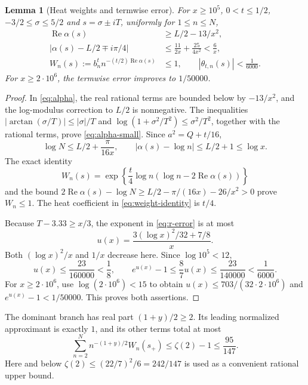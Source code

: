 \documentclass[11pt]{article}
\newtheorem{lemma}[theorem]{Lemma}
\theoremstyle{remark}
\newcommand{\abs}[1]{\left\lvert#1\right\rvert}
\numberwithin{equation}{section}
\begin{document}
\begin{lemma}[Heat weights and termwise error]\label{lem:ordinary}
For $x\ge10^5$, $0<t\le1/2$, $-3/2\le\sigma\le5/2$ and
$s=\sigma\pm iT$, uniformly for $1\le n\le N$,
\begin{align}
 \operatorname{Re}\alpha(s)&\ge L/2-13/x^2,\label{eq:alpha-real}\\
 \abs{\alpha(s)-L/2\mp i\pi/4}
    &\le\frac{11}{2x}+\frac{25}{4x^2}<\frac6x,\label{eq:alpha-small}\\
 W_n(s):=b_n^t n^{-(t/2)\operatorname{Re}\alpha(s)}&\le1,
 \qquad |\theta_{t,n}(s)|<\frac1{6000}.\label{eq:weights-error}
\end{align}
For $x\ge2\cdot10^6$, the termwise error improves to $1/50000$.
\end{lemma}
\begin{proof}
In \eqref{eq:alpha}, the real rational terms are bounded below by
$-13/x^2$, and the log-modulus correction to $L/2$ is nonnegative.
The inequalities $|\arctan(\sigma/T)|\le|\sigma|/T$ and
$\log(1+\sigma^2/T^2)\le\sigma^2/T^2$, together with the rational
terms, prove \eqref{eq:alpha-small}. Since $a^2=Q+t/16$,
\[
 \log N\le L/2+\frac{\pi}{16x},\qquad
 \abs{\alpha(s)-\log n}\le L/2+1\le\log x.
\]
The exact identity
\begin{equation}\label{eq:weight-identity}
 W_n(s)=\exp\left\{\frac t4\log n
                  (\log n-2\operatorname{Re}\alpha(s))\right\}
\end{equation}
and the bound
$2\operatorname{Re}\alpha(s)-\log N
 \ge L/2-\pi/(16x)-26/x^2>0$ prove $W_n\le1$.
The heat coefficient in \eqref{eq:weight-identity} is $t/4$.

Because $T-3.33\ge x/3$, the exponent in \eqref{eq:r-error} is at most
\[
 u(x)=\frac{3(\log x)^2/32+7/8}{x}.
\]
Both $(\log x)^2/x$ and $1/x$ decrease here. Since $\log10^5<12$,
\[
 u(x)\le\frac{23}{160000}<\frac18,\qquad
 e^{u(x)}-1\le\frac87u(x)\le\frac{23}{140000}<\frac1{6000}.
\]
For $x\ge2\cdot10^6$, use $\log(2\cdot10^6)<15$ to obtain
$u(x)\le703/(32\cdot2\cdot10^6)$ and
$e^{u(x)}-1<1/50000$. This proves both assertions.
\end{proof}

The dominant branch has real part $(1+y)/2\ge2$. Its leading
normalized approximant is exactly $1$, and its other terms total at most
\begin{equation}\label{eq:main-excess}
 \sum_{n=2}^N n^{-(1+y)/2}W_n(s_+)
 \le\zeta(2)-1\le\frac{95}{147}.
\end{equation}
Here and below $\zeta(2)\le(22/7)^2/6=242/147$ is used as a convenient
rational upper bound.
\end{document}
